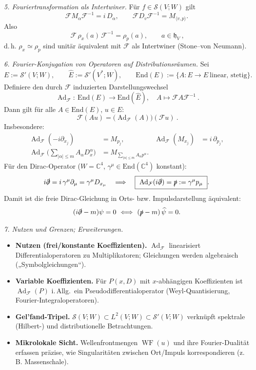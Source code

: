 \documentclass[10pt, letterpaper]{article}
\DeclareMathOperator{\WF}{WF}
\newcommand{\Ad}{\operatorname{Ad}}
\newcommand{\C}{\mathbb{C}}
\newcommand{\End}{\mathrm{End}}
\begin{document}
\medskip

\emph{5. Fouriertransformation als Intertwiner.}
Für \(f\in\mathcal{S}(V;W)\) gilt
\[
\mathcal{F}M_{\alpha}\mathcal{F}^{-1} = i\,D_{\alpha},\qquad
\mathcal{F}D_v\mathcal{F}^{-1} = M_{\langle v,p\rangle}.
\]
Also
\[
\boxed{\ \mathcal{F}\,\rho_x(a)\,\mathcal{F}^{-1} = \rho_p(a),\qquad a\in\mathfrak{h}_V\ },
\]
d.\,h. \(\rho_x\simeq\rho_p\) sind unitär äquivalent mit \(\mathcal{F}\) als Intertwiner (Stone–von Neumann).

\bigskip

\emph{6. Fourier-Konjugation von Operatoren auf Distributionsräumen.}
Sei
\[
E:=\mathcal{S}'(V;W),\qquad \hat E:=\mathcal{S}'(V^\ast;W),\qquad
\End(E):=\{A:E\to E\ \text{linear, stetig}\}.
\]
Definiere den durch \(\mathcal{F}\) induzierten Darstellungswechsel
\[
\boxed{\ \Ad_{\mathcal{F}}:\ \End(E)\to\End(\hat E),\quad A\mapsto \mathcal{F}A\mathcal{F}^{-1}\ }.
\]
Dann gilt für alle \(A\in\End(E)\), \(u\in E\):
\[
\boxed{\ \mathcal{F}(Au) = \big(\Ad_{\mathcal{F}}(A)\big)(\mathcal{F}u)\ }.
\]
Insbesondere:
\begin{align*}
\Ad_{\mathcal{F}}(-i\partial_{x_j}) &= M_{p_j}, &
\Ad_{\mathcal{F}}(M_{x_j}) &= i\,\partial_{p_j},\\
\Ad_{\mathcal{F}}\!\Big(\sum_{|\alpha|\le m}A_\alpha D_x^\alpha\Big) &= M_{ \sum_{|\alpha|\le m}A_\alpha p^\alpha }.
\end{align*}
Für den Dirac-Operator (\(W=\C^4\), \(\gamma^\mu\in\End(\C^4)\) konstant):
\[
i\slashed{\partial} = i\,\gamma^\mu\partial_\mu = \gamma^\mu D_{x_\mu}
\quad\Longrightarrow\quad
\boxed{\ \Ad_{\mathcal{F}}(i\slashed{\partial}) = \slashed{p} := \gamma^\mu p_\mu\ }.
\]
Damit ist die freie Dirac-Gleichung in Orts- bzw. Impulsdarstellung äquivalent:
\[
(i\slashed{\partial}-m)\psi=0
\ \Longleftrightarrow\
(\slashed{p}-m)\,\widehat{\psi}=0.
\]

\bigskip

\emph{7. Nutzen und Grenzen; Erweiterungen.}
\begin{itemize}
\item \textbf{Nutzen (frei/konstante Koeffizienten).} \(\Ad_{\mathcal{F}}\) linearisiert Differentialoperatoren zu Multiplikatoren; Gleichungen werden algebraisch („Symbolgleichungen“).
\item \textbf{Variable Koeffizienten.} Für \(P(x,D)\) mit \(x\)-abhängigen Koeffizienten ist \(\Ad_{\mathcal{F}}(P)\) i.\,Allg.\ ein Pseudodifferentialoperator (Weyl-Quantisierung, Fourier-Integraloperatoren).
\item \textbf{Gel'fand-Tripel.} \(\mathcal{S}(V;W)\subset L^2(V;W)\subset\mathcal{S}'(V;W)\) verknüpft spektrale (Hilbert-) und distributionelle Betrachtungen.
\item \textbf{Mikrolokale Sicht.} Wellenfrontmengen \( \WF(u) \) und ihre Fourier-Dualität erfassen präzise, wie Singularitäten zwischen Ort/Impuls korrespondieren (z.\,B. Massenschale).
\end{itemize}
\end{document}
